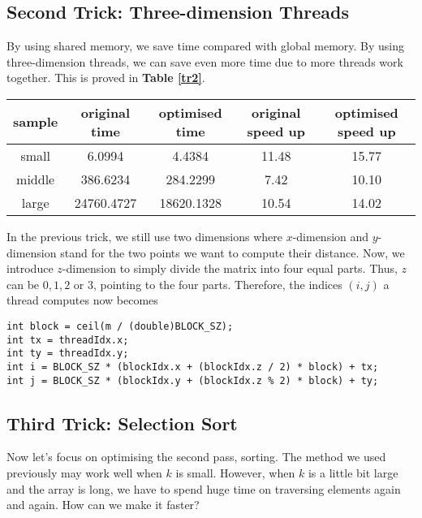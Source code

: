 \documentclass[11pt, a4paper]{article}
\makeatletter
\newcommand\tcaption{\def\@captype{table}\caption}
\newcommand{\tref}[1]{\textbf{Table \ref{#1}}}
\makeatother
\begin{document}
\subsection{Second Trick: Three-dimension Threads}

By using shared memory, we save time compared with global memory. By using three-dimension threads, we can save even more time due to more threads work together. This is proved in \tref{tr2}.

\begin{center}
    \tcaption{Time cost of distance computing using trick 2}\label{tr2}
    \begin{tabular}{ccccc}
        \toprule
        sample & original time & optimised time & original speed up & optimised speed up \\
        \midrule
        small & 6.0994 & 4.4384 & 11.48 & 15.77 \\
        middle & 386.6234 & 284.2299 & 7.42 & 10.10 \\
        large & 24760.4727 & 18620.1328 & 10.54 & 14.02 \\
        \bottomrule
    \end{tabular}
\end{center}

In the previous trick, we still use two dimensions where $x$-dimension and $y$-dimension stand for the two points we want to compute their distance. Now, we introduce $z$-dimension to simply divide the matrix into four equal parts. Thus, $z$ can be $0, 1, 2$ or $3$, pointing to the four parts. Therefore, the indices $(i, j)$ a thread computes now becomes

\begin{lstlisting}
int block = ceil(m / (double)BLOCK_SZ);
int tx = threadIdx.x;
int ty = threadIdx.y;
int i = BLOCK_SZ * (blockIdx.x + (blockIdx.z / 2) * block) + tx;
int j = BLOCK_SZ * (blockIdx.y + (blockIdx.z % 2) * block) + ty;
\end{lstlisting}

\subsection{Third Trick: Selection Sort}

Now let's focus on optimising the second pass, sorting. The method we used previously may work well when $k$ is small. However, when $k$ is a little bit large and the array is long, we have to spend huge time on traversing elements again and again. How can we make it faster?
\end{document}
